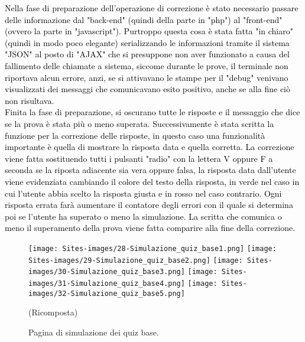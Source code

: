 \begin{minipage}{\textwidth}
	\textcolor{black}{Nella fase di preparazione dell'operazione di correzione è stato necessario passare delle informazione dal "back-end" (quindi della parte in "php") al "front-end" (ovvero la parte in "javascript"). Purtroppo questa cosa è stata fatta "in chiaro" (quindi in modo poco elegante) serializzando le informazioni tramite il sistema "JSON" al posto di "AJAX" che si presuppone non aver  funzionato a causa del fallimento delle chiamate a sistema, siccome durante le prove, il terminale non riportava alcun errore, anzi, se si attivavano le stampe per il "debug" venivano visualizzati dei messaggi che comunicavano esito positivo, anche se alla fine ciò non risultava.\\
	Finita la fase di preparazione, si oscurano tutte le risposte e il messaggio che dice se la prova è stata più o meno superata. Successivamente è stata scritta la funzione per la correzione delle risposte, in questo caso una funzionalità importante è quella di mostrare la risposta data e quella corretta. La correzione viene fatta sostituendo tutti i pulsanti "radio" con la lettera V oppure F a seconda se la riposta adiacente sia vera oppure falsa, la risposta data dall'utente viene evidenziata cambiando il colore del testo della risposta, in verde nel caso in cui l'utente abbia scelto la risposta giusta e in rosso nel caso contrario. Ogni risposta errata farà aumentare il contatore degli errori con il quale si determina poi se l'utente ha superato o meno la simulazione. La scritta che comunica o meno il superamento della prova viene fatta comparire alla fine della correzione.}
\end{minipage}

\leavevmode\newpage

\begin{minipage}{\textwidth}
\begin{figure}[H]
	\begin{center}
		\texttt{[image: Sites-images/28-Simulazione\_quiz\_base1.png]}
		\texttt{[image: Sites-images/29-Simulazione\_quiz\_base2.png]}
		\texttt{[image: Sites-images/30-Simulazione\_quiz\_base3.png]}
		\texttt{[image: Sites-images/31-Simulazione\_quiz\_base4.png]}
		\texttt{[image: Sites-images/32-Simulazione\_quiz\_base5.png]}
		\caption{Pagina di simulazione dei quiz base.}
		(Ricomposta)
	\end{center}
\end{figure}
\end{minipage}

